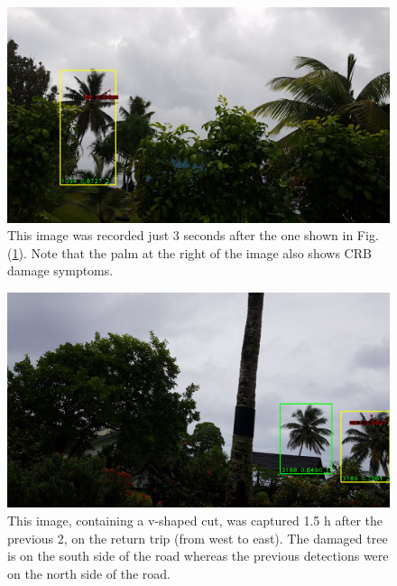 \documentclass[12pt,letterpaper,english,bibliography=totocnumbered, abstract=on]{scrartcl}
\begin{document}
\begin{figure}
	\centering
	\includegraphics[width=\linewidth]{images/IMG_20231007_125007}
	\caption{This image was recorded just 3 seconds after the one shown in Fig. (\ref{fig:125007}). Note that the palm at the right of the image also shows CRB damage symptoms.}
	\label{fig:125007}
\end{figure}

\begin{figure}
	\centering
	\includegraphics[width=\linewidth]{images/IMG_20231007_143930}
	\caption{This image, containing a v-shaped cut, was captured 1.5 h after the previous 2, on the return trip (from west to east). The damaged tree is on the south side of the road whereas the previous detections were on the north side of the road. }
	\label{fig:143930}
\end{figure}
\end{document}
